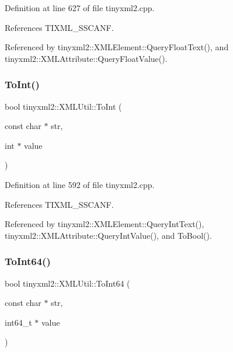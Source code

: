 Definition at line 627 of file tinyxml2.\+cpp.



References T\+I\+X\+M\+L\+\_\+\+S\+S\+C\+A\+NF.



Referenced by tinyxml2\+::\+X\+M\+L\+Element\+::\+Query\+Float\+Text(), and tinyxml2\+::\+X\+M\+L\+Attribute\+::\+Query\+Float\+Value().

\mbox{\label{classtinyxml2_1_1_x_m_l_util_ad4df4023d11ee3fca9689c49b9707323}} 
\subsubsection{ToInt()}
{\footnotesize\ttfamily bool tinyxml2\+::\+X\+M\+L\+Util\+::\+To\+Int (\begin{DoxyParamCaption}\item[{const char $\ast$}]{str,  }\item[{int $\ast$}]{value }\end{DoxyParamCaption})\hspace{0.3cm}{\ttfamily [static]}}



Definition at line 592 of file tinyxml2.\+cpp.



References T\+I\+X\+M\+L\+\_\+\+S\+S\+C\+A\+NF.



Referenced by tinyxml2\+::\+X\+M\+L\+Element\+::\+Query\+Int\+Text(), tinyxml2\+::\+X\+M\+L\+Attribute\+::\+Query\+Int\+Value(), and To\+Bool().

\mbox{\label{classtinyxml2_1_1_x_m_l_util_afe2ea09257431cd2b4b6d440552e4195}} 
\subsubsection{ToInt64()}
{\footnotesize\ttfamily bool tinyxml2\+::\+X\+M\+L\+Util\+::\+To\+Int64 (\begin{DoxyParamCaption}\item[{const char $\ast$}]{str,  }\item[{int64\+\_\+t $\ast$}]{value }\end{DoxyParamCaption})\hspace{0.3cm}{\ttfamily [static]}}



